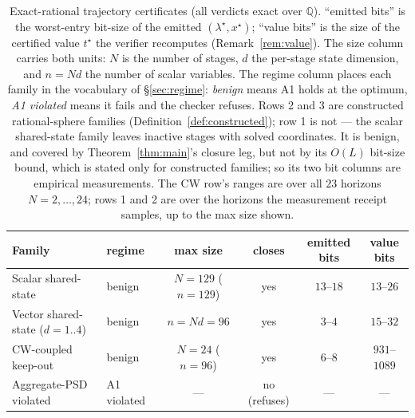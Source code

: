 \documentclass[11pt]{article}
\theoremstyle{definition}
\theoremstyle{remark}
\newcommand{\Q}{\mathbb{Q}}
\renewcommand{\_}{\ifdim\fontdimen3\font=0pt\relax\char`\_\else\textunderscore\fi\hspace{0pt}}
\begin{document}
\begin{table}[t]\centering
\caption{Exact-rational trajectory certificates (all verdicts exact over $\Q$).
``emitted bits'' is the worst-entry bit-size of the emitted
$(\lambda^\star,x^\star)$; ``value bits'' is the size of the certified value
$t^\star$ the verifier recomputes (Remark~\ref{rem:value}). The size column
carries both units: $N$ is the number of stages, $d$ the per-stage state
dimension, and $n=Nd$ the number of scalar variables. The regime column
places each family in the vocabulary of \S\ref{sec:regime}: \emph{benign}
means A1 holds at the optimum, \emph{A1 violated} means it fails and the
checker refuses. Rows 2 and 3 are constructed rational-sphere families
(Definition~\ref{def:constructed}); row 1 is not --- the scalar shared-state
family leaves inactive stages with solved coordinates. It is benign, and
covered by Theorem~\ref{thm:main}'s closure leg, but not by its $O(L)$
bit-size bound, which is stated only for constructed families; so its two bit
columns are empirical measurements. The CW row's ranges are over all $23$
horizons $N=2,\dots,24$; rows 1 and 2 are over the horizons the measurement
receipt samples, up to the max size shown.}
\label{tab:results}
\small
\setlength{\tabcolsep}{4pt}
\begin{tabular}{@{}llcccc@{}}
\toprule
Family & regime & max size & closes & emitted bits & value bits\\
\midrule
Scalar shared-state & benign & $N{=}129$ ($n{=}129$) & yes & $13$--$18$ & $13$--$26$\\
Vector shared-state ($d=1..4$) & benign & $n{=}Nd{=}96$ & yes & $3$--$4$ & $15$--$32$\\
CW-coupled keep-out & benign & $N{=}24$ ($n{=}96$) & yes & $6$--$8$ & $931$--$1089$\\
Aggregate-PSD violated & A1 violated & --- & no (refuses) & --- & ---\\
\bottomrule
\end{tabular}
\end{table}
\end{document}
